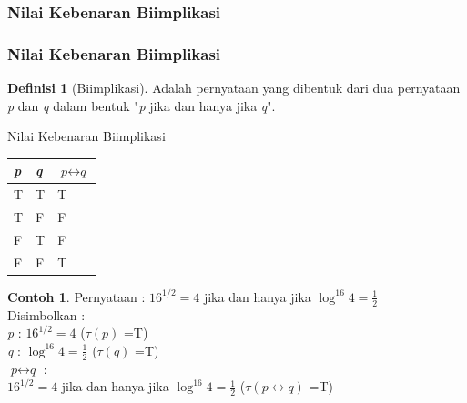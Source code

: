 \documentclass[handout]{beamer}
\theoremstyle{definition}
\newtheorem{definisi}[theorem]{Definisi}
\theoremstyle{example}
\newtheorem{contoh}[theorem]{Contoh}
\begin{document}
\subsubsection{Nilai Kebenaran Biimplikasi}
\begin{frame}[shrink]
	\frametitle{Nilai Kebenaran Biimplikasi}
	\begin{definisi}[Biimplikasi]
			Adalah pernyataan yang dibentuk dari dua pernyataan \textit{p} dan \textit{q} dalam bentuk "\textit{p} jika dan hanya jika \textit{q}". 	
	\end{definisi}
	\begin{block}{Nilai Kebenaran Biimplikasi}
		\begin{tabular}{ | l | l | l | }
			\hline
			\textit{p} & \textit{q} & $\textit{p}\leftrightarrow\textit{q}$ \\ \hline
			T & T & T \\ \hline
			T & F & F \\ \hline
			F & T & F \\ \hline
			F & F & T \\     		 
			\hline
		\end{tabular}
	\end{block}
	\begin{contoh}
			Pernyataan : $16^{1/2} = 4$ jika dan hanya jika $\log^{16}{4} = \frac{1}{2}$\\
			Disimbolkan :\\
			\textit{p} : $16^{1/2} = 4$ ($\tau(\textit{p})$ =T)\\
			\textit{q} : $\log^{16}{4} = \frac{1}{2}$ ($\tau(\textit{q})$ =T)\\
			$\textit{p}\leftrightarrow\textit{q}$ : \\$16^{1/2} = 4$ jika dan hanya jika $\log^{16}{4} = \frac{1}{2}$ ($\tau(\textit{p}\leftrightarrow\textit{q})$ =T)	
	\end{contoh}
\end{frame}
\end{document}
